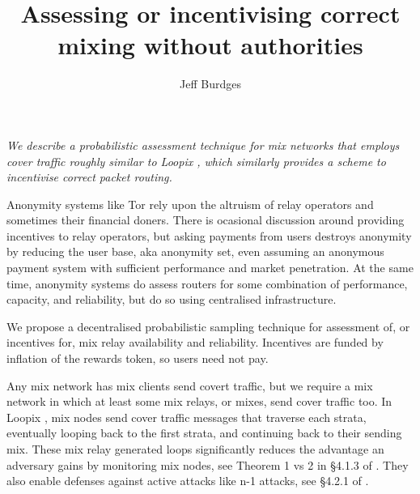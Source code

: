 ﻿\documentclass{sig-alternate-hotpets}
\title{Assessing or incentivising correct mixing without authorities} %
\author{Jeff Burdges}
\date{}
\begin{document}
\maketitle

{\it
We describe a probabilistic assessment technique for %
mix networks that employs cover traffic roughly similar to
Loopix \cite{Loopix}, which similarly provides a scheme to
incentivise correct packet routing.}
\medskip

Anonymity systems like Tor %
rely upon the altruism of relay operators and sometimes their financial doners.
There is ocasional discussion around providing incentives to relay operators, %
but asking payments from users destroys anonymity by reducing the user base, aka anonymity set, even assuming an anonymous payment system with sufficient performance and market penetration.  
At the same time, anonymity systems do assess routers for some combination of performance, capacity, and reliability, but do so using centralised infrastructure. 

We propose a decentralised probabilistic sampling technique for assessment of, or incentives for, mix relay availability and reliability.  
Incentives are funded by inflation of the rewards token, so users need not pay.

Any mix network has mix clients send covert traffic, but we require a mix network in which at least some mix relays, or mixes, send cover traffic too.  
In Loopix \cite{Loopix}, mix nodes send cover traffic messages that traverse each strata, eventually looping back to the first strata, and continuing back to their sending mix.  
These mix relay generated loops significantly reduces the advantage an adversary gains by monitoring mix nodes, see Theorem 1 vs 2 in \S4.1.3 of \cite{Loopix}.  %
They also enable defenses against active attacks like n-1 attacks, see \S4.2.1 of \cite{Loopix}.  %
\end{document}
